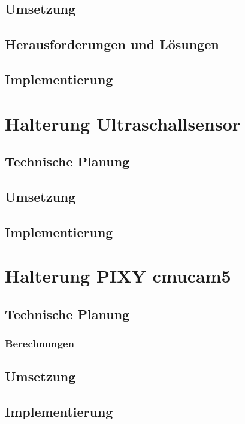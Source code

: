 	\subsection{Umsetzung}

	\subsection{Herausforderungen und Lösungen}

	\subsection{Implementierung}

\section{Halterung Ultraschallsensor}

	\subsection{Technische Planung}

	\subsection{Umsetzung}

	\subsection{Implementierung}

\section{Halterung PIXY cmucam5}

	\subsection{Technische Planung}

		\subsubsection{Berechnungen}

	\subsection{Umsetzung}

	\subsection{Implementierung}

